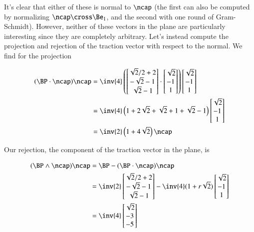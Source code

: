 It's clear that either of these is normal to $\ncap$ (the first can also be computed by normalizing $\ncap \cross \Be_1$, and the second with one round of Gram-Schmidt).  However, neither of these vectors in the plane are particularly interesting since they are completely arbitrary.  Let's instead compute the projection and rejection of the traction vector with respect to the normal.  We find for the projection

\begin{align*}
(\BP \cdot \ncap) \ncap
&=
\inv{4}
\left(
\begin{bmatrix}
\sqrt{2}/2 + 2 \\
-\sqrt{2} -1 \\
\sqrt{2} - 1
\end{bmatrix}
\cdot 
\begin{bmatrix}
\sqrt{2} \\
-1 \\
1
\end{bmatrix} 
\right)
\begin{bmatrix}
\sqrt{2} \\
-1 \\
1
\end{bmatrix}  \\
&=
\inv{4}
\left( 
1 + 2\sqrt{2}
+\sqrt{2} +1 
+\sqrt{2} - 1
\right)
\begin{bmatrix}
\sqrt{2} \\
-1 \\
1
\end{bmatrix}  \\
&=
\inv{2}
\left( 
1 + 4\sqrt{2}
\right)
\ncap
\end{align*}

Our rejection, the component of the traction vector in the plane, is

\begin{align*}
(\BP \wedge \ncap) \ncap 
&=
\BP - (\BP \cdot \ncap)\ncap \\
&=
\inv{2}
\begin{bmatrix}
\sqrt{2}/2 + 2 \\
-\sqrt{2} -1 \\
\sqrt{2} - 1
\end{bmatrix}
-\inv{4}(1 + r \sqrt{2})
\begin{bmatrix}
\sqrt{2} \\
-1 \\
1
\end{bmatrix} \\
&=
\inv{4}
\begin{bmatrix}
\sqrt{2} \\
-3 \\
-5
\end{bmatrix}
\end{align*}

